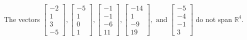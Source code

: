 \begin{exercise}
\begin{exerciseStatement}
  \end{exerciseStatement}
  \begin{exerciseAnswer}
   The vectors \(\left[\begin{array}{r}
-2 \\
1 \\
3 \\
-5
\end{array}\right] , \left[\begin{array}{r}
-5 \\
1 \\
0 \\
1
\end{array}\right] , \left[\begin{array}{r}
-1 \\
-1 \\
-6 \\
11
\end{array}\right] , \left[\begin{array}{r}
-14 \\
1 \\
-9 \\
19
\end{array}\right] , \text{ and } \left[\begin{array}{r}
-5 \\
-4 \\
-1 \\
3
\end{array}\right]\) 
  	 do not  
	span \(\mathbb{R}^4\).
  


  \end{exerciseAnswer}
\end{exercise}